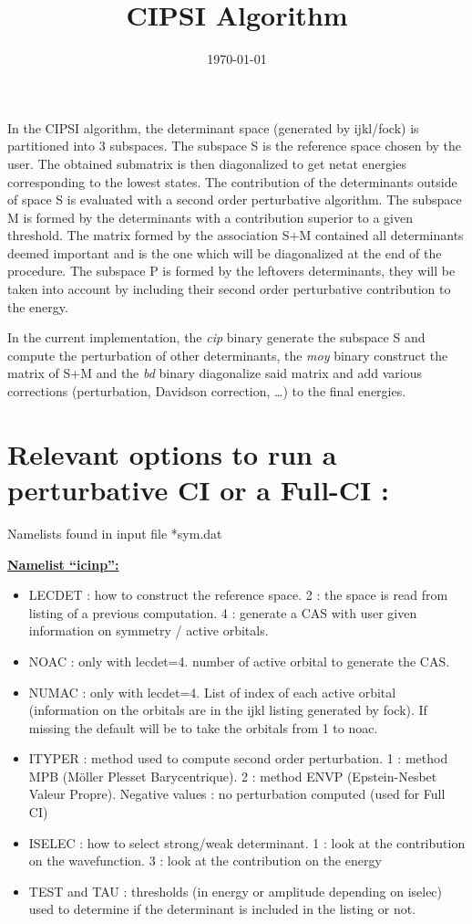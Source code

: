 \documentclass[a4paper,10pt]{article}
\title{CIPSI Algorithm}
\author{}
\date{\today}
\begin{document}
\maketitle

In the CIPSI algorithm, the determinant space (generated by ijkl/fock) is partitioned into 3 subspaces.
The subspace S is the reference space chosen by the user. The obtained submatrix is then diagonalized to get netat energies corresponding to the lowest states. The contribution of the determinants outside of space S is evaluated with a second order perturbative algorithm.
The subspace M is formed by the determinants with a contribution superior to a given threshold. The matrix formed by the association S+M contained all determinants deemed important and is the one which will be diagonalized at the end of the procedure.
The subspace P is formed by the leftovers determinants, they will be taken into account by including their second order perturbative contribution to the energy.


In the current implementation, the \textit{cip} binary generate the subspace S and compute the perturbation of other determinants, the \textit{moy} binary construct the matrix of S+M and the \textit{bd} binary diagonalize said matrix and add various corrections (perturbation, Davidson correction, …) to the final energies.

\section{Relevant options to run a perturbative CI or a Full-CI :}

Namelists found in input file *sym.dat

\underline{\textbf{Namelist “icinp”:}}
\begin{itemize}
 \item LECDET : how to construct the reference space. 2 : the space is read from listing of a previous computation. 4 : generate a CAS with user given information on symmetry / active orbitals.
 \item NOAC : only with lecdet=4. number of active orbital to generate the CAS.
 \item NUMAC : only with lecdet=4. List of index of each active orbital (information on the orbitals are in the ijkl listing generated by fock). If missing the default will be to take the orbitals from 1 to noac.
 \item ITYPER : method used to compute second order perturbation. 1 : method MPB (Möller Plesset Barycentrique). 2 : method ENVP (Epstein-Nesbet Valeur Propre). Negative values : no perturbation computed (used for Full CI)
 \item ISELEC : how to select strong/weak determinant. 1 : look at the contribution on the  wavefunction. 3 : look at the contribution on the energy
 \item TEST and TAU : thresholds (in energy or amplitude depending on iselec) used to determine if the determinant is included in the listing or not.
\end{itemize}
\end{document}
